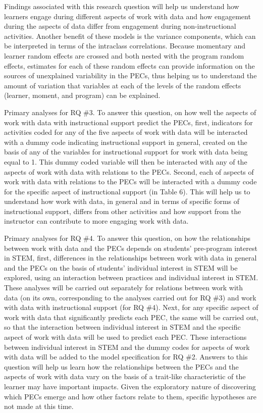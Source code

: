 \documentclass[]{msu-thesis}
\theoremstyle{definition}
\theoremstyle{definition}
\theoremstyle{definition}
\theoremstyle{remark}
\begin{document}
Findings associated with this research question will help us understand
how learners engage during different aspects of work with data and how
engagement during the aspects of data differ from engagement during
non-instructional activities. Another benefit of these models is the
variance components, which can be interpreted in terms of the intraclass
correlations. Because momentary and learner random effects are crossed
and both nested with the program random effects, estimates for each of
these random effects can provide information on the sources of
unexplained variability in the PECs, thus helping us to understand the
amount of variation that variables at each of the levels of the random
effects (learner, moment, and program) can be explained.

Primary analyses for RQ \#3. To answer this question, on how well the
aspects of work with data with instructional support predict the PECs,
first, indicators for activities coded for any of the five aspects of
work with data will be interacted with a dummy code indicating
instructional support in general, created on the basis of any of the
variables for instructional support for work with data being equal to 1.
This dummy coded variable will then be interacted with any of the
aspects of work with data with relations to the PECs. Second, each of
aspects of work with data with relations to the PECs will be interacted
with a dummy code for the specific aspect of instructional support (in
Table 6). This will help us to understand how work with data, in general
and in terms of specific forms of instructional support, differs from
other activities and how support from the instructor can contribute to
more engaging work with data.

Primary analyses for RQ \#4. To answer this question, on how the
relationships between work with data and the PECs depends on students'
pre-program interest in STEM, first, differences in the relationships
between work with data in general and the PECs on the basis of students'
individual interest in STEM will be explored, using an interaction
between practices and individual interest in STEM. These analyses will
be carried out separately for relations between work with data (on its
own, corresponding to the analyses carried out for RQ \#3) and work with
data with instructional support (for RQ \#4). Next, for any specific
aspect of work with data that significantly predicts each PEC, the same
will be carried out, so that the interaction between individual interest
in STEM and the specific aspect of work with data will be used to
predict each PEC. These interactions between individual interest in STEM
and the dummy codes for aspects of work with data will be added to the
model specification for RQ \#2. Answers to this question will help us
learn how the relationships between the PECs and the aspects of work
with data vary on the basis of a trait-like characteristic of the
learner may have important impacts. Given the exploratory nature of
discovering which PECs emerge and how other factors relate to them,
specific hypotheses are not made at this time.
\end{document}
